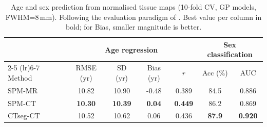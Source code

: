 \begin{table}[t]
\centering
\small
\caption{Age and sex prediction from normalised tissue maps (10-fold CV, GP models, FWHM=8\,mm). Following the evaluation paradigm of \citet{brudfors2019superres}. Best value per column in bold; for Bias, smaller magnitude is better.}
\label{tab:prediction}
\small
\begin{tabular}{lcccccc}
\toprule
 & \multicolumn{4}{c}{Age regression} & \multicolumn{2}{c}{Sex classification} \\
\cmidrule(lr){2-5} \cmidrule(lr){6-7}
Method & RMSE (yr) & SD (yr) & Bias (yr) & $r$ & Acc (\%) & AUC \\
\midrule
SPM-MR & 10.82 & 10.90 & -0.48 & 0.389 & 84.5 & 0.886 \\
SPM-CT & \textbf{10.30} & \textbf{10.39} & \textbf{0.04} & \textbf{0.449} & 86.2 & 0.869 \\
CTseg-CT & 10.52 & 10.62 & 0.06 & 0.436 & \textbf{87.9} & \textbf{0.920} \\
\bottomrule
\end{tabular}
\end{table}
